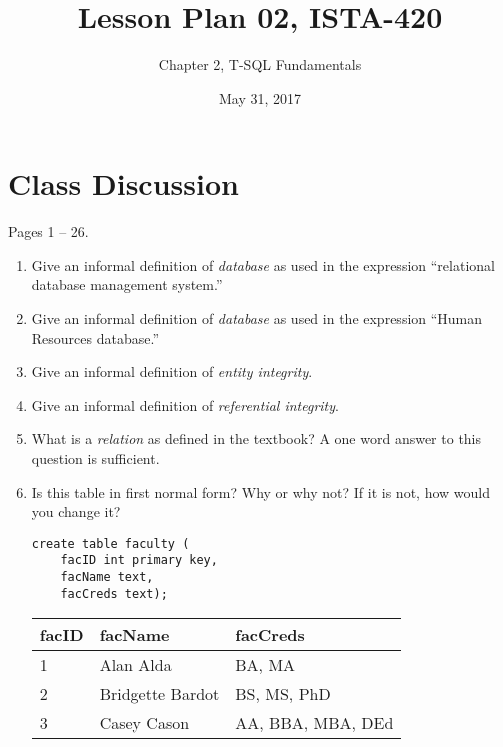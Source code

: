 \documentclass{article}
\title{Lesson Plan 02, ISTA-420}
\author{Chapter 2, T-SQL Fundamentals}
\date{May 31, 2017}
\begin{document}
    

    \maketitle{}

    \section{Class Discussion}

            Pages 1 -- 26.

    \begin{enumerate}


        \item Give an informal definition of \textit{database} as used in the expression ``relational database management system.''


        \item Give an informal definition of \textit{database} as used in the expression ``Human Resources database.''


        \item Give an informal definition of \textit{entity integrity}.


        \item Give an informal definition of \textit{referential integrity}.


        \item What is a \textit{relation} as defined in the textbook? A one word answer to this question is sufficient.


        \item Is this table in first normal form? Why or why not? If it is not, how would you change it?

            \begin{verbatim}
create table faculty (
    facID int primary key,
    facName text,
    facCreds text);
            \end{verbatim}

            \begin{tabular}{| l | l | l |}
\hline
\textbf{facID} & \textbf{facName} & \textbf{facCreds} \\
\hline
1 & Alan Alda & BA, MA \\
\hline
2 & Bridgette Bardot & BS, MS, PhD \\
\hline
3 & Casey Cason & AA, BBA, MBA, DEd \\
\hline

            \end{tabular}


\end{enumerate}
\end{document}
